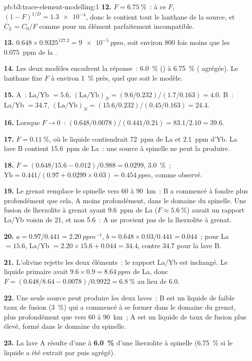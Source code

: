 \begin{solution}{pb:b3:trace-element-modelling:1}
\textbf{12.} $F = \qty{6.75}{\percent}$~: à ce $F$, $(1 - F)^{1/D} =
\num{1.3e-4}$, donc le  contient tout le lanthane de la source, et
$\bar C_L = C_0/F$ comme pour un élément parfaitement incompatible.

\textbf{13.} $0.648\times0.9325^{127.2} = \qty{9e-5}{ppm}$, soit environ 800 fois
moins que les \qty{0.075}{ppm} de la .

\textbf{14.} Les deux modèles encadrent la réponse~: \qty{6.0}{\percent} ()
à \qty{6.75}{\percent} ( agrégée). Le lanthane fixe $F$ à
environ \qty{1}{\percent} près, quel que soit le modèle.

\textbf{15.} A~: La/Yb $= 5.6$, $(\mathrm{La}/\mathrm{Yb})_N =
(9.6/0.232)/(1.7/0.163) = 4.0$. B~: La/Yb $= 34.7$, $(\mathrm{La}/\mathrm{Yb})_N
= (15.6/0.232)/(0.45/0.163) = 24.4$.

\textbf{16.} Lorsque $F \to 0$~: $(0.648/0.0078)/(0.441/0.21) = 83.1/2.10 = 39.6$.

\textbf{17.} $F = \qty{0.11}{\percent}$, où le liquide contiendrait
\qty{72}{ppm} de La et \qty{2.1}{ppm} d'Yb. La lave B contient \qty{15.6}{ppm} de La~: une
source à spinelle ne peut la produire.

\textbf{18.} $F = (0.648/15.6 - 0.012)/0.988 = 0.0299$, \qty{3.0}{\percent}~;
$\mathrm{Yb} = 0.441/(0.97 + 0.0299\times0.03) = \qty{0.454}{ppm}$, comme
observé.

\textbf{19.} Le grenat remplace le spinelle vers 60 à \qty{90}{km}~: B a commencé à
fondre plus profondément que cela, A moins profondément, dans le domaine du spinelle. Une fusion de lherzolite à grenat
ayant \qty{9.6}{ppm} de La ($F \approx \qty{5.6}{\percent}$) aurait un rapport La/Yb
voisin de 21, et non 5.6~: A ne provient pas de la lherzolite à grenat.

\textbf{20.} $a = 0.97/0.441 = \qty{2.20}{ppm^{-1}}$, $b = 0.648\times0.03/0.441
= 0.044$~; pour La $= 15.6$, La/Yb $= 2.20\times15.6 + 0.044 = 34.4$, contre
34.7 pour la lave B.

\textbf{21.} L'olivine rejette les deux éléments~: le rapport La/Yb est inchangé. Le liquide primaire
avait $9.6\times0.9 = \qty{8.64}{ppm}$ de La, donc $F = (0.648/8.64 -
0.0078)/0.9922 = \qty{6.8}{\percent}$ au lieu de 6.0.

\textbf{22.} Une seule source peut produire les deux laves~: B est un liquide de faible taux de fusion
(\qty{3}{\percent}) qui a commencé à se former dans le domaine du grenat, plus profondément que vers 60 à
\qty{90}{km}~; A est un liquide de taux de fusion plus élevé, formé dans le domaine du spinelle.

\textbf{23.} La lave A résulte d'une
 à \textbf{\qty[text-series-to-math=true]{6.0}{\percent}} d'une lherzolite à spinelle (\qty{6.75}{\percent} si le liquide a été
extrait par  puis agrégé).
\end{solution}
